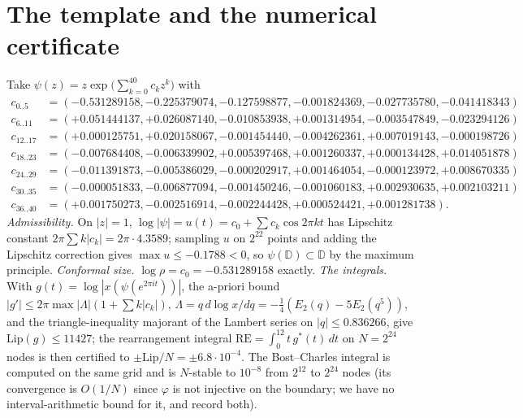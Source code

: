 \documentclass[11pt]{amsart}
\theoremstyle{remark}
\newcommand{\D}{\mathbb D}\newcommand{\T}{\mathbb T}\newcommand{\BC}{\mathrm{BC}}\newcommand{\RE}{\mathrm{RE}}
\begin{document}
\section{The template and the numerical certificate}
Take $\psi(z)=z\exp\bigl(\sum_{k=0}^{40}c_kz^k\bigr)$ with
{\small
\begin{align*}
c_{0..5}&=(-0.531289158,-0.225379074,-0.127598877,-0.001824369,-0.027735780,-0.041418343)\\
c_{6..11}&=(+0.051444137,+0.026087140,-0.010853938,+0.001314954,-0.003547849,-0.023294126)\\
c_{12..17}&=(+0.000125751,+0.020158067,-0.001454440,-0.004262361,+0.007019143,-0.000198726)\\
c_{18..23}&=(-0.007684408,-0.006339902,+0.005397468,+0.001260337,+0.000134428,+0.014051878)\\
c_{24..29}&=(-0.011391873,-0.005386029,-0.000202917,+0.001464054,-0.000123972,+0.008670335)\\
c_{30..35}&=(-0.000051833,-0.006877094,-0.001450246,-0.001060183,+0.002930635,+0.002103211)\\
c_{36..40}&=(+0.001750273,-0.002516914,-0.002244428,+0.000524421,+0.001281738).
\end{align*}}
\noindent\emph{Admissibility.} On $|z|=1$, $\log|\psi|=u(t)=c_0+\sum c_k\cos2\pi kt$ has Lipschitz constant $2\pi\sum k|c_k|=2\pi\cdot4.3589$; sampling $u$ on $2^{22}$ points and adding the Lipschitz correction gives $\max u\le-0.1788<0$, so $\psi(\D)\subset\D$ by the maximum principle. \emph{Conformal size.} $\log\rho=c_0=-0.531289158$ exactly. \emph{The integrals.} With $g(t)=\log|x(\psi(e^{2\pi it}))|$, the a-priori bound $|g'|\le2\pi\max|\Lambda|(1+\sum k|c_k|)$, $\Lambda=q\,d\log x/dq=-\tfrac14(E_2(q)-5E_2(q^5))$, and the triangle-inequality majorant of the Lambert series on $|q|\le0.836266$, give $\mathrm{Lip}(g)\le11427$; the rearrangement integral $\RE=\int_0^12t\,g^*(t)\,dt$ on $N=2^{24}$ nodes is then certified to $\pm\mathrm{Lip}/N=\pm6.8\cdot10^{-4}$. The Bost--Charles integral is computed on the same grid and is $N$-stable to $10^{-8}$ from $2^{12}$ to $2^{24}$ nodes (its convergence is $O(1/N)$ since $\varphi$ is not injective on the boundary; we have no interval-arithmetic bound for it, and record both).
\end{document}
